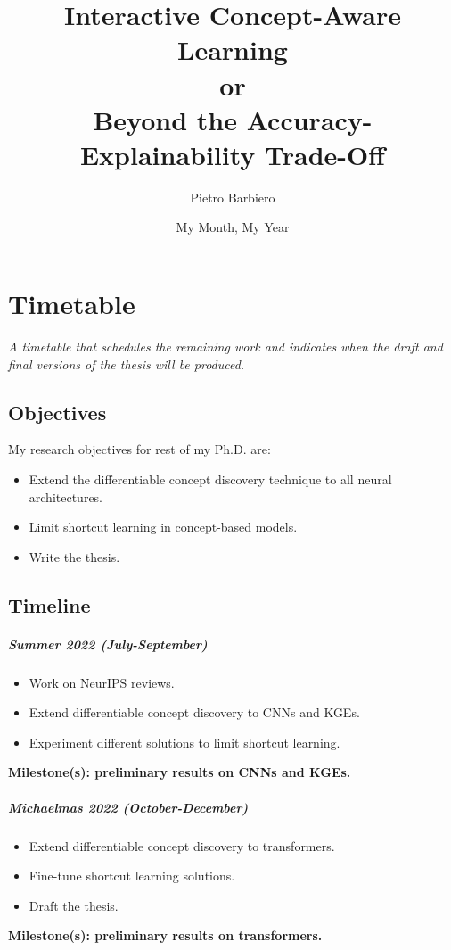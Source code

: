\documentclass[withindex,glossary]{cam-thesis}
\title{Interactive Concept-Aware Learning\\or\\Beyond the Accuracy-Explainability Trade-Off}
\author{Pietro Barbiero}
\date{My Month, My Year}
\theoremstyle{plain}
\theoremstyle{definition}
\theoremstyle{remark}
\begin{document}
\frontmatter{}



\chapter*{Timetable}
\textit{A timetable that schedules the remaining work and indicates when the draft and final versions of the thesis will be produced.}


\section*{Objectives}
My research objectives for rest of my Ph.D. are:
\begin{itemize}
    \item Extend the differentiable concept discovery technique to all neural architectures.
    \item Limit shortcut learning in concept-based models.
    \item Write the thesis.
\end{itemize}


\section*{Timeline}

\paragraph{Summer 2022 (July-September)}
\begin{itemize}
    \item Work on NeurIPS reviews.
    \item Extend differentiable concept discovery to CNNs and KGEs.
	\item Experiment different solutions to limit shortcut learning.
\end{itemize}
\textbf{Milestone(s): preliminary results on CNNs and KGEs.}

\paragraph{Michaelmas 2022 (October-December)}
\begin{itemize}
	\item Extend differentiable concept discovery to transformers.
	\item Fine-tune shortcut learning solutions.
	\item Draft the thesis.
\end{itemize}
\textbf{Milestone(s): preliminary results on transformers.}
\end{document}
